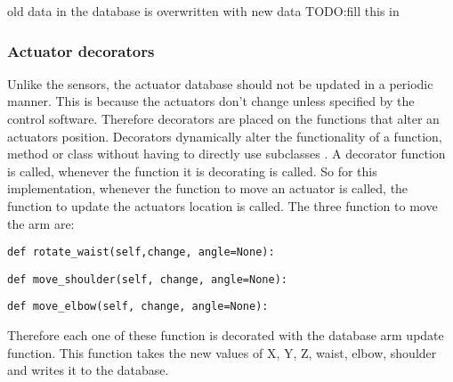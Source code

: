 old data in the database is overwritten with new data TODO:fill this in

\subsubsection{Actuator decorators}
Unlike the sensors, the actuator database should not be updated in a periodic manner. This is because the actuators don't change unless specified by the control software. Therefore decorators are placed on the functions that alter an actuators position.
\newline
Decorators dynamically alter the functionality of a function, method or class without having to directly use subclasses \cite{decoratordefinition}. A decorator function is called, whenever the function it is decorating is called. So for this implementation, whenever the function to move an actuator is called, the function to update the actuators location is called.
\newline
The three function to move the arm are:
\begin{lstlisting}[style=custompython]
def rotate_waist(self,change, angle=None):  
\end{lstlisting}
\begin{lstlisting}[style=custompython]
def move_shoulder(self, change, angle=None):  
\end{lstlisting}
\begin{lstlisting}[style=custompython]
def move_elbow(self, change, angle=None):  
\end{lstlisting}
Therefore each one of these function is decorated with the database arm update function. This function takes the new values of X, Y, Z, waist, elbow, shoulder and writes it to the database. 
\newline







